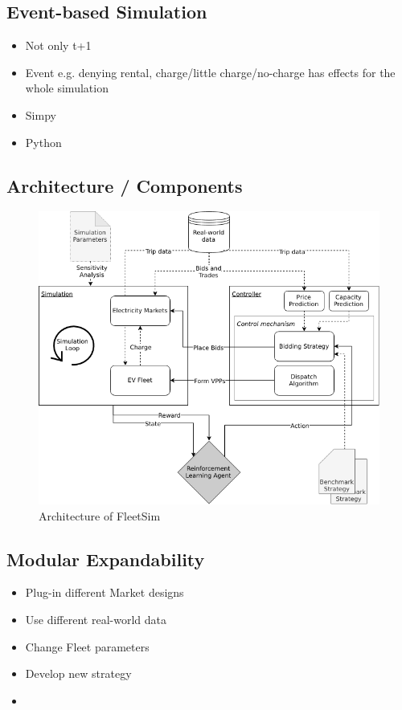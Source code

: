 \documentclass[a4paper, 12pt]{article}
\begin{document}
\subsection{Event-based Simulation}
\label{sec:org847b9d2}
\begin{itemize}
\item Not only t+1
\item Event e.g. denying rental, charge/little charge/no-charge has effects for the
whole simulation
\item Simpy
\item Python
\end{itemize}
\subsection{Architecture / Components}
\label{sec:org9f1db8c}
\begin{figure}[htbp]
\centering
\includegraphics[width=1\linewidth]{./fig/simulation_platform.png}
\caption[FleetSim Architecture]{Architecture of FleetSim \label{fig-fleetsim}}
\end{figure}

\subsection{Modular Expandability}
\label{sec:org0945548}
\begin{itemize}
\item Plug-in different Market designs
\item Use different real-world data
\item Change Fleet parameters
\item Develop new strategy
\item
\end{itemize}
\end{document}
